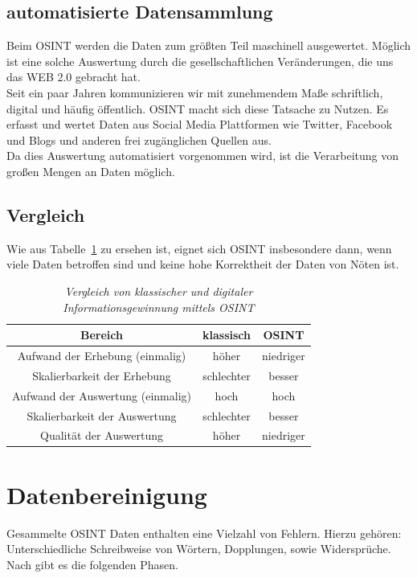 \documentclass[twoside,a4paper]{article}
\begin{document}
\subsection{automatisierte Datensammlung}
Beim OSINT werden die Daten zum größten Teil maschinell ausgewertet. Möglich ist eine solche Auswertung durch die gesellschaftlichen Veränderungen, die uns das WEB 2.0 gebracht hat. \\
Seit ein paar Jahren kommunizieren wir mit zunehmendem Maße schriftlich, digital und häufig öffentlich. 
OSINT macht sich diese Tatsache zu Nutzen. Es erfasst und wertet Daten aus Social Media Plattformen wie Twitter, Facebook und Blogs und anderen frei zugänglichen Quellen aus.\\
Da dies Auswertung automatisiert vorgenommen wird, ist die Verarbeitung von großen Mengen an Daten möglich.
 
\subsection{Vergleich}
Wie aus Tabelle~\ref{tab:Vergleich} zu ersehen ist, eignet sich OSINT insbesondere dann, wenn viele Daten betroffen sind und keine hohe Korrektheit der Daten von Nöten ist.

\begin{table}[htdp]
  \caption{\it Vergleich von klassischer und digitaler Informationsgewinnung mittels OSINT}
  \begin{center}
    \begin{tabular}{|c|c|c|}\hline
      Bereich & klassisch & OSINT \\\hline
      Aufwand der Erhebung (einmalig)	& höher & niedriger\\
      Skalierbarkeit der Erhebung 		& schlechter & besser\\
      Aufwand der Auswertung (einmalig) 	& hoch & hoch\\
	  Skalierbarkeit der Auswertung 		& schlechter & besser\\
	  Qualität der Auswertung 			& höher & niedriger\\	  
     \hline
    \end{tabular}
  \end{center}
  \label{tab:Vergleich}
\end{table}


\section{Datenbereinigung}
Gesammelte OSINT Daten enthalten eine Vielzahl von Fehlern. Hierzu gehören: Unterschiedliche Schreibweise von Wörtern, Dopplungen, sowie Widersprüche. Nach  \cite{data_consolidation_solution} gibt es die folgenden Phasen.
\end{document}
